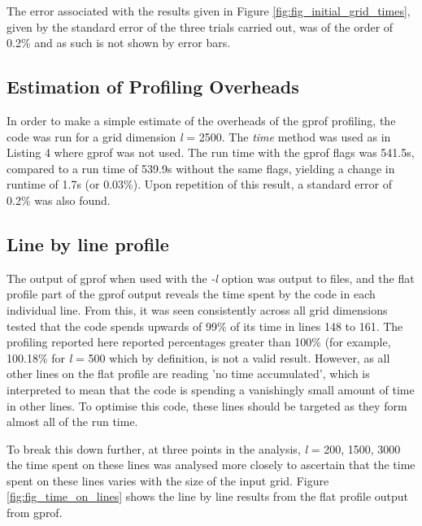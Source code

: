\documentclass[12pt,a4paper]{article}
\begin{document}
The error associated with the results given in Figure \ref{fig:fig_initial_grid_times}, given by the standard error of the three trials carried out, was of the order of 0.2\% and as such is not shown by error bars.

\subsection{Estimation of Profiling Overheads}\label{sec:overheads}

In order to make a simple estimate of the overheads of the gprof profiling, the code was run for a grid dimension {\em l} = 2500. The {\em time} method was used as in Listing 4 where gprof was not used. The run time with the gprof flags was 541.5s, compared to a run time of 539.9s without the same flags, yielding a change in runtime of 1.7s (or 0.03\%). Upon repetition of this result, a standard error of 0.2\% was also found.

\subsection{Line by line profile}\label{sec:line_profiling}

The output of gprof when used with the {\em -l} option was output to files, and the flat profile part of the gprof output reveals the time spent by the code in each individual line. From this, it was seen consistently across all grid dimensions tested that the code spends upwards of 99\% of its time in lines 148 to 161.
The profiling reported here reported percentages greater than 100\% (for example, 100.18\% for {\em l} = 500 which by definition, is not a valid result. However, as all other lines on the flat profile are reading 'no time accumulated', which is interpreted to mean that the code is spending a vanishingly small amount of time in other lines. To optimise this code, these lines should be targeted as they form almost all of the run time.

To break this down further, at three points in the analysis, {\em l} = 200, 1500, 3000 the time spent on these lines was analysed more closely to ascertain that the time spent on these lines varies with the size of the input grid. Figure \ref{fig:fig_time_on_lines} shows the line by line results from the flat profile output from gprof. 
\end{document}
